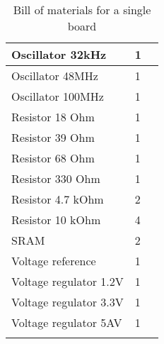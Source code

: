 \begin{longtable}{| p{5cm} | p{2cm} | p{2cm} |}
	Oscillator 32kHz & 1 &\\ \hline
	Oscillator 48MHz & 1 &\\ \hline
	Oscillator 100MHz & 1 &\\ \hline
	Resistor 18 Ohm & 1 &\\ \hline
	Resistor 39 Ohm & 1 &\\ \hline
	Resistor 68 Ohm & 1 &\\ \hline
	Resistor 330 Ohm & 1 &\\ \hline
	Resistor 4.7 kOhm & 2 &\\ \hline
	Resistor 10 kOhm & 4 &\\ \hline
	SRAM & 2 &\\ \hline
	Voltage reference & 1 &\\ \hline
	Voltage regulator 1.2V & 1 &\\ \hline
	Voltage regulator 3.3V & 1 &\\ \hline
	Voltage regulator 5AV & 1 &\\
	\hline
	\caption{Bill of materials for a single board}
	\label{tab:bom}
\end{longtable}

